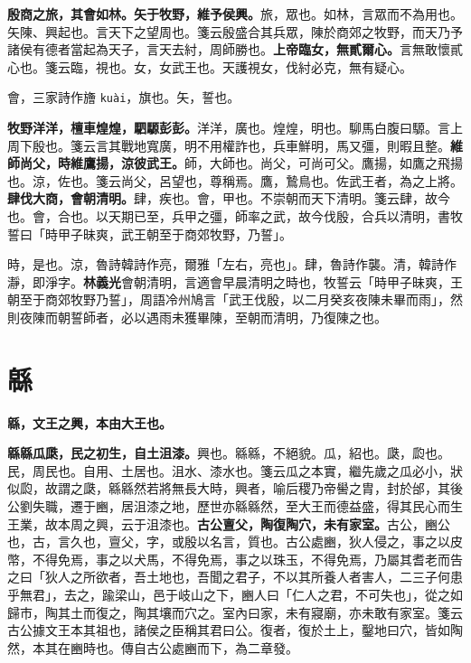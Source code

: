\textbf{殷商之旅，其會如林。矢于牧野，維予侯興。}{\footnotesize 旅，眾也。如林，言眾而不為用也。矢陳、興起也。言天下之望周也。箋云殷盛合其兵眾，陳於商郊之牧野，而天乃予諸侯有德者當起為天子，言天去紂，周師勝也。}\textbf{上帝臨女，無貳爾心。}{\footnotesize 言無敢懷貳心也。箋云臨，視也。女，女武王也。天護視女，伐紂必克，無有疑心。}

\begin{quoting}會，三家詩作旝 \texttt{kuài}，旗也。矢，誓也。\end{quoting}

\textbf{牧野洋洋，檀車煌煌，駟騵彭彭。}{\footnotesize 洋洋，廣也。煌煌，明也。駠馬白腹曰騵。言上周下殷也。箋云言其戰地寬廣，明不用權詐也，兵車鮮明，馬又彊，則暇且整。}\textbf{維師尚父，時維鷹揚，涼彼武王。}{\footnotesize 師，大師也。尚父，可尚可父。鷹揚，如鷹之飛揚也。涼，佐也。箋云尚父，呂望也，尊稱焉。鷹，鷙鳥也。佐武王者，為之上將。}\textbf{肆伐大商，會朝清明。}{\footnotesize 肆，疾也。會，甲也。不崇朝而天下清明。箋云肆，故今也。會，合也。以天期已至，兵甲之彊，師率之武，故今伐殷，合兵以清明，書牧誓曰「時甲子昧爽，武王朝至于商郊牧野，乃誓」。}

\begin{quoting}時，是也。涼，魯詩韓詩作亮，爾雅「左右，亮也」。肆，魯詩作襲。清，韓詩作瀞，即淨字。\textbf{林義光}會朝清明，言適會早晨清明之時也，牧誓云「時甲子昧爽，王朝至于商郊牧野乃誓」，周語冷州鳩言「武王伐殷，以二月癸亥夜陳未畢而雨」，然則夜陳而朝誓師者，必以遇雨未獲畢陳，至朝而清明，乃復陳之也。\end{quoting}

\section{緜}


\textbf{緜，文王之興，本由大王也。}

\textbf{緜緜瓜瓞，民之初生，自土沮漆。}{\footnotesize 興也。緜緜，不絕貌。瓜，紹也。瓞，瓝也。民，周民也。自用、土居也。沮水、漆水也。箋云瓜之本實，繼先歲之瓜必小，狀似瓝，故謂之瓞，緜緜然若將無長大時，興者，喻后稷乃帝嚳之胄，封於邰，其後公劉失職，遷于豳，居沮漆之地，歷世亦緜緜然，至大王而德益盛，得其民心而生王業，故本周之興，云于沮漆也。}\textbf{古公亶父，陶復陶穴，未有家室。}{\footnotesize 古公，豳公也，古，言久也，亶父，字，或殷以名言，質也。古公處豳，狄人侵之，事之以皮幣，不得免焉，事之以犬馬，不得免焉，事之以珠玉，不得免焉，乃屬其耆老而告之曰「狄人之所欲者，吾土地也，吾聞之君子，不以其所養人者害人，二三子何患乎無君」，去之，踰梁山，邑于岐山之下，豳人曰「仁人之君，不可失也」，從之如歸市，陶其土而復之，陶其壤而穴之。室內曰家，未有寢廟，亦未敢有家室。箋云古公據文王本其祖也，諸侯之臣稱其君曰公。復者，復於土上，鑿地曰穴，皆如陶然，本其在豳時也。傳自古公處豳而下，為二章發。}

